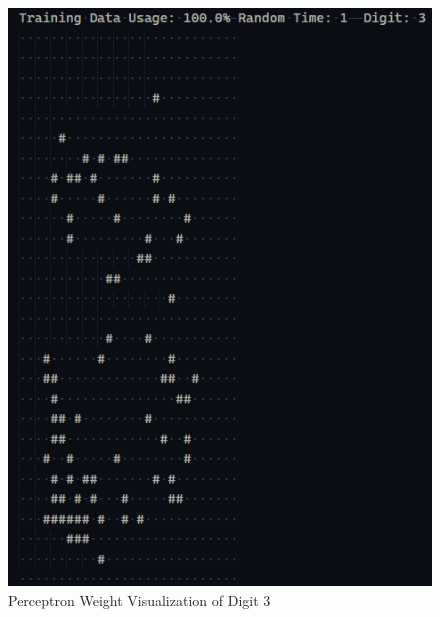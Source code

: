\documentclass[11pt]{article}
\begin{document}
		\begin{figure}[H]
			\centering
			\includegraphics[scale=0.3]{Weight Visualization Digit 3.jpg}
			\caption{Perceptron Weight Visualization of Digit 3}\label{fig:1}
		\end{figure}
\end{document}
